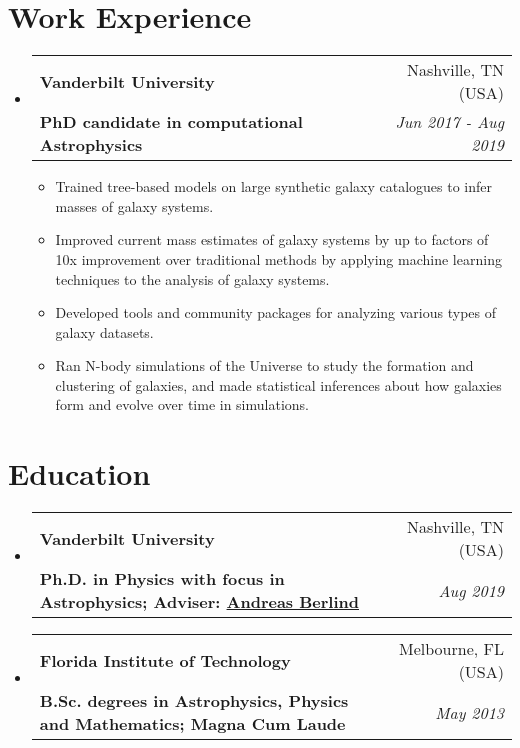 \documentclass[letterpaper,11pt]{article}
\makeatletter
\newcommand{\resumeItem}[2]{
  \item
    \small{
    \textbf{#1}{: #2 \vspace{-2pt}}
  }
}
\newcommand{\resumeSubheading}[4]{
  \vspace{-1pt}\item
    \begin{tabular*}{0.97\textwidth}[t]{l@{\extracolsep{\fill}}r}
      \textbf{#1} & #2 \\
      {\textbf{\small#3}} & \textit{\small #4} \\
    \end{tabular*}\vspace{-5pt}
}
\newcommand{\resumeSubSubheading}[2]{
    \begin{tabular*}{0.97\textwidth}{l@{\extracolsep{\fill}}r}
      \textit{\small#1} & \textit{\small #2} \\
    \end{tabular*}\vspace{-5pt}
}
\newcommand{\resumeSubHeadingListStart}{
  \begin{itemize}[leftmargin=*]
    \itemsep
    \itemseparation
}
\newcommand{\resumeSubHeadingListEnd}{\end{itemize}}
\newcommand{\resumeItemListStart}{\begin{itemize}}
\newcommand{\resumeItemListEnd}{\end{itemize}\vspace{-5pt}}
\newcommand{\aberlind}{\href{https://www.linkedin.com/in/aberlind/}{Andreas Berlind}}
\newcommand{\itemseparation}{0em}
\newcommand{\workExperienceBulletSpacing}{-3pt}
\newcommand{\workExperienceBullet}[1]{
  \item{
    {#1 \vspace{\workExperienceBulletSpacing}}
  }
}
\makeatother
\begin{document}


\section{Work Experience}
  \label{sec:work-experience}
  \resumeSubHeadingListStart

    \resumeSubheading
      {Vanderbilt University}{Nashville, TN (USA)}
      {PhD candidate in computational Astrophysics}{Jun 2017 - Aug 2019}
      \resumeItemListStart
        \workExperienceBullet{
          Trained tree-based models on large synthetic galaxy catalogues
          to infer masses of galaxy systems.
        }
        \workExperienceBullet{
          Improved current mass estimates of galaxy systems by up to factors
          of 10x improvement over traditional methods by applying machine
          learning techniques to the analysis of galaxy systems.
        }
        \workExperienceBullet{
          Developed tools and community packages for analyzing various types
          of galaxy datasets.
        }
        \workExperienceBullet{
          Ran N-body simulations of the Universe to study the formation and
          clustering of galaxies, and made statistical inferences about how
          galaxies form and evolve over time in simulations.
        }
      \resumeItemListEnd


  \resumeSubHeadingListEnd


\section{Education}
  \label{sec:education}
  \resumeSubHeadingListStart
    \resumeSubheading
    {Vanderbilt University}{Nashville, TN (USA)}
    {Ph.D. in Physics with focus in Astrophysics;
    Adviser: \aberlind}{Aug 2019}
    \resumeSubheading
      {Florida Institute of Technology}{Melbourne, FL (USA)}
      {B.Sc. degrees in Astrophysics, Physics and Mathematics;
      Magna Cum Laude}{May 2013}
  \resumeSubHeadingListEnd

\end{document}
